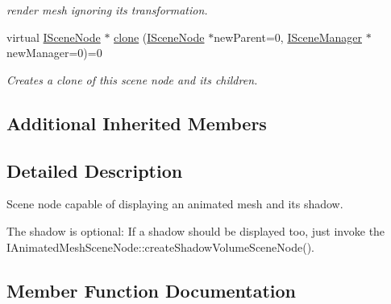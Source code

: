 \begin{DoxyCompactItemize}
\begin{DoxyCompactList}\small\item\em render mesh ignoring its transformation. \end{DoxyCompactList}\item 
virtual \hyperlink{classirr_1_1scene_1_1ISceneNode}{I\+Scene\+Node} $\ast$ \hyperlink{classirr_1_1scene_1_1IAnimatedMeshSceneNode_a47aabf6554e3f91bbb033edb8668cec8}{clone} (\hyperlink{classirr_1_1scene_1_1ISceneNode}{I\+Scene\+Node} $\ast$new\+Parent=0, \hyperlink{classirr_1_1scene_1_1ISceneManager}{I\+Scene\+Manager} $\ast$new\+Manager=0)=0
\begin{DoxyCompactList}\small\item\em Creates a clone of this scene node and its children. \end{DoxyCompactList}\end{DoxyCompactItemize}
\subsection*{Additional Inherited Members}


\subsection{Detailed Description}
Scene node capable of displaying an animated mesh and its shadow. 

The shadow is optional\+: If a shadow should be displayed too, just invoke the I\+Animated\+Mesh\+Scene\+Node\+::create\+Shadow\+Volume\+Scene\+Node(). 

\subsection{Member Function Documentation}
\mbox{\label{classirr_1_1scene_1_1IAnimatedMeshSceneNode_aaa4947ed5f7ba72870da37ee1fc17125}} 
